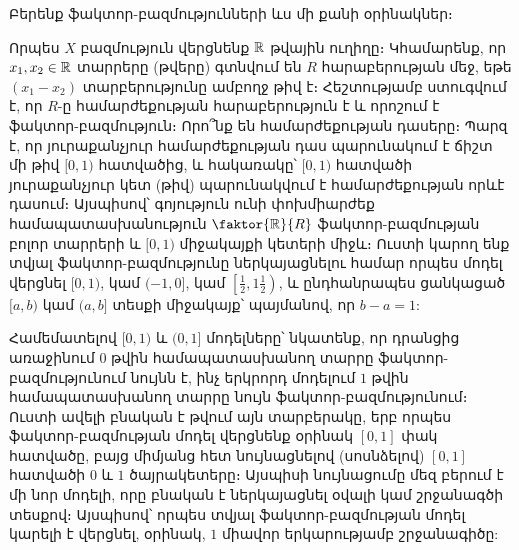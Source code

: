 \documentclass[./main.tex]{subfiles}
\begin{document}
\par Բերենք ֆակտոր-բազմությունների ևս մի քանի օրինակներ։
\begin{example}\label{ch2ex9} 
Որպես $X$ բազմություն վերցնենք $\mathbb{R}$ թվային ուղիղը։ Կհամարենք, որ $x_1,x_2 \in \mathbb{R} $ տարրերը (թվերը) գտնվում են $R$ հարաբերության մեջ, եթե ${(x_1-x_2)}$ տարբերությունը ամբողջ թիվ է։ Հեշտությամբ ստուգվում է, որ $R$-ը համարժեքու\-թյան հա\-րա\-բե\-րու\-թյուն է և որոշում է ֆակտոր-բազմություն։ Որո՞նք են համարժե\-քու\-թյան դասերը։ Պարզ է, որ յուրաքանչյուր համարժեքության դաս պարունակում է ճիշտ մի թիվ $[0,1)$ հատվածից, և հակառակը՝ $[0,1)$ հատվածի յուրաքանչյուր կետ (թիվ) պարու\-նակ\-վում է համարժեքության որևէ դասում։ Այսպիսով՝ գոյություն ունի փոխ\-միար\-ժեք հա\-մա\-պա\-տաս\-խա\-նություն $\faktor{\R}{R}$ ֆակտոր-բազմության բոլոր տարրերի և $[0,1)$ միջակայքի կետերի միջև։ Ուստի կարող ենք տվյալ ֆակտոր-բազմությունը ներկայաց\-նելու համար որպես մոդել վերցնել $[0,1)$, կամ $(-1,0]$, կամ $\left[\frac{1}{2},1\frac{1}{2}\right)$, և ընդհանրապես ցանկացած $[a,b)$ կամ $(a,b]$ տեսքի միջակայք՝ պայմանով, որ $b-a=1$:
\par Համեմատելով $[0,1)$ և $(0,1]$ մոդելները՝ նկատենք, որ դրանցից առաջինում $0$ թվին համապատասխանող տարրը ֆակտոր-բազմությունում նույնն է, ինչ երկրորդ մոդելում $1$ թվին համապատասխանող տարրը նույն ֆակտոր-բազմությունում։ Ուս\-տի ավելի բնական է թվում այն տարբերակը, երբ որպես ֆակտոր-բազմության մոդել վերցնենք օրինակ $[0,1]$ փակ հատվածը, բայց միմյանց հետ նույնացնելով (սոսնձելով) $[0,1]$ հատվածի $0$ և $1$ ծայրակետերը։ Այսպիսի նույնացումը մեզ բերում է մի նոր մոդելի, որը բնական է ներկայացնել օվալի կամ շրջանագծի տեսքով։ Այսպիսով՝ որպես տվյալ ֆակտոր-բազմության մոդել կարելի է վերցնել, օրինակ, $1$ միավոր երկարությամբ շրջա\-նա\-գի\-ծը:
\end{example}
\label{օրինակ 2:9}
\end{document}
